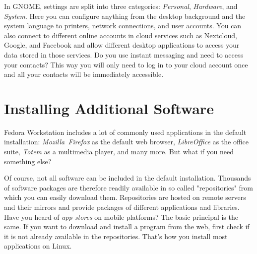 \begin{enumerate}
In GNOME, settings are split into three categories: \emph{Personal}, \emph{Hardware}, and \emph{System}. Here you can configure anything from the desktop background and the system language to printers, network connections, and user accounts. You can also connect to different online accounts in cloud services such as Nextcloud, Google, and Facebook and allow different desktop applications to access your data stored in those services. Do you use instant messaging and need to access your contacts? This way you will only need to log in to your cloud account once and all your contacts will be immediately accessible.
\end{enumerate}

\section*{Installing Additional Software}

Fedora Workstation includes a lot of commonly used applications in the default installation: \emph{Mozilla~Firefox} as the default web browser, \emph{LibreOffice} as the office suite, \emph{Totem} as a multimedia player, and many more. But what if you need something else?

Of course, not all software can be included in the default installation. Thousands of software packages are therefore readily available in so called "repositories" from which you can easily download them. Repositories are hosted on remote servers and their mirrors and provide packages of different applications and libraries. Have you heard of \emph{app stores} on mobile platforms? The basic principal is the same. If you want to download and install a program from the web, first check if it is not already available in the repositories. That's how you install most applications on Linux.

